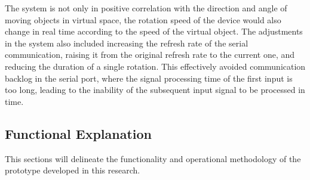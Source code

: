 The system is not only in positive correlation with the direction and angle of moving objects in virtual space,  the rotation speed of the device would also change in real time according to the speed of the virtual object. The adjustments in the system also included increasing the refresh rate of the serial communication, raising it from the original refresh rate to the current one, and reducing the duration of a single rotation. This effectively avoided communication backlog in the serial port, where the signal processing time of the first input is too long, leading to the inability of the subsequent input signal to be processed in time.

\subsection{Functional Explanation}

This sections will delineate the functionality and operational methodology of the prototype developed in this research. 

